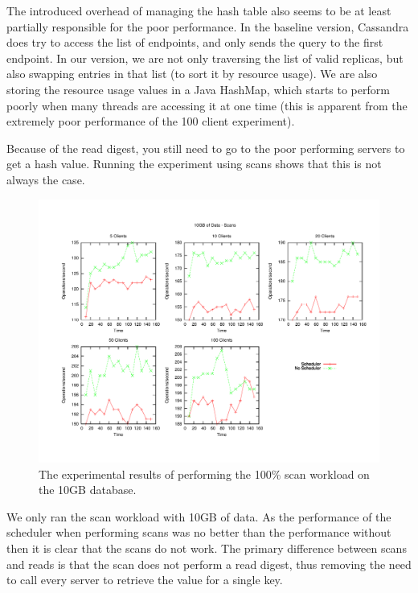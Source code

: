 \documentclass[]{acm_proc_article-sp}
\begin{document}
The introduced overhead of managing the hash table also seems to be at least partially responsible for the poor performance. In the baseline version, Cassandra does try to access the list of endpoints, and only sends the query to the first endpoint. In our version, we are not only traversing the list of valid replicas, but also swapping entries in that list (to sort it by resource usage). We are also storing the resource usage values in a Java HashMap, which starts to perform poorly when many threads are accessing it at one time (this is apparent from the extremely poor performance of the 100 client experiment).

Because of the read digest, you still need to go to the poor performing servers to get a hash value. Running the experiment using scans shows that this is not always the case.


\begin{figure}[t]
\centering
\includegraphics[scale=0.63]{images/10GB_Scans.pdf}
\vspace{-15pt}
\caption{The experimental results of performing the 100\% scan workload on the 10GB database.}
\label{fig:10g_scans}
\end{figure}

We only ran the scan workload with 10GB of data. As the performance of the scheduler when performing scans was no better than the performance without then it is clear that the scans do not work. The primary difference between scans and reads is that the scan does not perform a read digest, thus removing the need to call every server to retrieve the value for a single key.
\end{document}
